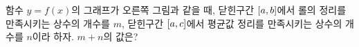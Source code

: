 \noindent\begin{minipage}[t]{0.58\linewidth}\vspace{0pt}\raggedright 함수 $y=f(x)$의 그래프가 오른쪽 그림과 같을 때, 닫힌구간 $[a{,}\mkern3mu\mathopen{}b]$에서 롤의 정리를 만족시키는 상수의 개수를 $m$, 닫힌구간 $[a{,}\mkern3mu\mathopen{}c]$에서 평균값 정리를 만족시키는 상수의 개수를 $n$이라 하자. $m+n$의 값은?\end{minipage}\hfill\begin{minipage}[t]{0.4\linewidth}\vspace{0pt}\centering \resizebox{\ifdim\width>\linewidth\linewidth\else\width\fi}{!}{}\end{minipage}\par
{}
